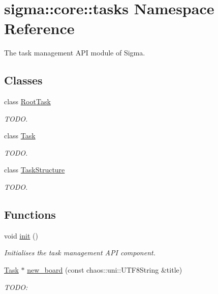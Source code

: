 \hypertarget{namespacesigma_1_1core_1_1tasks}{\section{sigma\-:\-:core\-:\-:tasks Namespace Reference}
\label{namespacesigma_1_1core_1_1tasks}
}


The task management A\-P\-I module of Sigma.  


\subsection*{Classes}
\begin{DoxyCompactItemize}
\item 
class \hyperlink{classsigma_1_1core_1_1tasks_1_1_root_task}{Root\-Task}
\begin{DoxyCompactList}\small\item\em T\-O\-D\-O. \end{DoxyCompactList}\item 
class \hyperlink{classsigma_1_1core_1_1tasks_1_1_task}{Task}
\begin{DoxyCompactList}\small\item\em T\-O\-D\-O. \end{DoxyCompactList}\item 
class \hyperlink{classsigma_1_1core_1_1tasks_1_1_task_structure}{Task\-Structure}
\begin{DoxyCompactList}\small\item\em T\-O\-D\-O. \end{DoxyCompactList}\end{DoxyCompactItemize}
\subsection*{Functions}
\begin{DoxyCompactItemize}
\item 
void \hyperlink{namespacesigma_1_1core_1_1tasks_a71cfeadea76272dda6429aaade0cd9e7}{init} ()
\begin{DoxyCompactList}\small\item\em Initialises the task management A\-P\-I component. \end{DoxyCompactList}\item 
\hypertarget{namespacesigma_1_1core_1_1tasks_a48a5931bef9e90b993a4761f09a1c0d1}{\hyperlink{classsigma_1_1core_1_1tasks_1_1_task}{Task} $\ast$ \hyperlink{namespacesigma_1_1core_1_1tasks_a48a5931bef9e90b993a4761f09a1c0d1}{new\-\_\-board} (const chaos\-::uni\-::\-U\-T\-F8\-String \&title)}\label{namespacesigma_1_1core_1_1tasks_a48a5931bef9e90b993a4761f09a1c0d1}

\begin{DoxyCompactList}\small\item\em T\-O\-D\-O\-: \end{DoxyCompactList}\end{DoxyCompactItemize}


